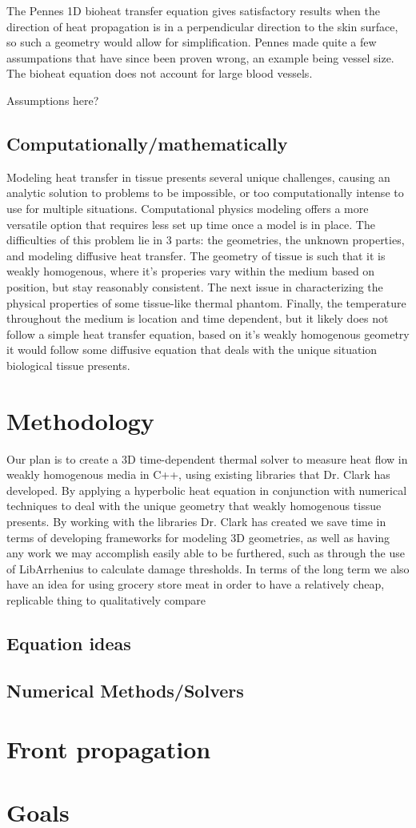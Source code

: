 \documentclass[12pt]{article}
\begin{document}
The Pennes 1D bioheat transfer equation gives satisfactory results when the direction of heat propagation is in a perpendicular direction to the skin surface, so such a geometry would allow for simplification. 
Pennes made quite a few assumpations that have since been proven wrong, an example being vessel size. The bioheat equation does not account for large blood vessels. 

Assumptions here? 
	
\subsection{Computationally/mathematically}
Modeling heat transfer in tissue presents several unique challenges, causing an analytic solution to problems to be impossible, or too computationally intense to use for multiple situations. Computational physics modeling offers a more versatile option that requires less set up time once a model is in place. The difficulties of this problem lie in 3 parts: the geometries, the unknown properties, and modeling diffusive heat transfer.
The geometry of tissue is such that it is weakly homogenous, where it's properies vary within the medium based on position, but stay reasonably consistent. The next issue in characterizing the physical properties of some tissue-like thermal phantom. Finally, the temperature throughout the medium is location and time dependent, but it likely does not follow a simple heat transfer equation, based on it's weakly homogenous geometry it would follow some diffusive equation that deals with the unique situation biological tissue presents.
\section{Methodology}
Our plan is to create a 3D time-dependent thermal solver to measure heat flow in weakly homogenous media in C++, using existing libraries that Dr. Clark has developed. By applying a hyperbolic heat equation in conjunction with numerical techniques to deal with the unique geometry that weakly homogenous tissue presents. By working with the libraries Dr. Clark has created we save time in terms of developing frameworks for modeling 3D geometries, as well as having any work we may accomplish easily able to be furthered, such as through the use of LibArrhenius to calculate damage thresholds. In terms of the long term we also have an idea for using grocery store meat in order to have a relatively cheap, replicable thing to qualitatively compare

\subsection{Equation ideas}
\subsection{Numerical Methods/Solvers}
\section{Front propagation}
\section{Goals}
\end{document}
